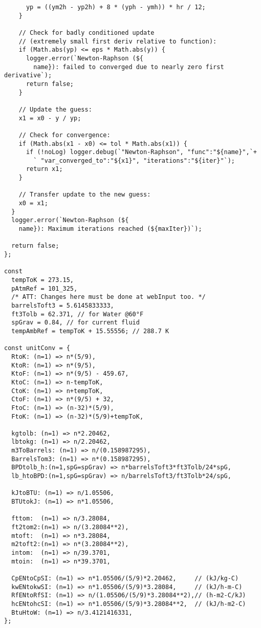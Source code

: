 \begin{verbatim}
      yp = ((ym2h - yp2h) + 8 * (yph - ymh)) * hr / 12;
    }

    // Check for badly conditioned update 
    // (extremely small first deriv relative to function):
    if (Math.abs(yp) <= eps * Math.abs(y)) {
      logger.error(`Newton-Raphson (${
        name}): failed to converged due to nearly zero first derivative`);
      return false;
    }

    // Update the guess:
    x1 = x0 - y / yp;

    // Check for convergence:
    if (Math.abs(x1 - x0) <= tol * Math.abs(x1)) {
      if (!noLog) logger.debug(`"Newton-Raphson", "func":"${name}",`+
        ` "var_converged_to":"${x1}", "iterations":"${iter}"`);
      return x1;
    }

    // Transfer update to the new guess:
    x0 = x1;
  }
  logger.error(`Newton-Raphson (${
    name}): Maximum iterations reached (${maxIter})`);

  return false;
};

const 
  tempToK = 273.15,
  pAtmRef = 101_325,
  /* ATT: Changes here must be done at webInput too. */
  barrelsToft3 = 5.6145833333,
  ft3Tolb = 62.371, // for Water @60°F
  spGrav = 0.84, // for current fluid
  tempAmbRef = tempToK + 15.55556; // 288.7 K

const unitConv = {
  RtoK: (n=1) => n*(5/9),
  KtoR: (n=1) => n*(9/5),
  KtoF: (n=1) => n*(9/5) - 459.67,
  KtoC: (n=1) => n-tempToK,
  CtoK: (n=1) => n+tempToK,
  CtoF: (n=1) => n*(9/5) + 32,
  FtoC: (n=1) => (n-32)*(5/9),
  FtoK: (n=1) => (n-32)*(5/9)+tempToK,

  kgtolb: (n=1) => n*2.20462,
  lbtokg: (n=1) => n/2.20462,
  m3ToBarrels: (n=1) => n/(0.158987295),
  BarrelsTom3: (n=1) => n*(0.158987295),
  BPDtolb_h:(n=1,spG=spGrav) => n*barrelsToft3*ft3Tolb/24*spG,
  lb_htoBPD:(n=1,spG=spGrav) => n/barrelsToft3/ft3Tolb*24/spG,

  kJtoBTU: (n=1) => n/1.05506,
  BTUtokJ: (n=1) => n*1.05506,

  fttom:  (n=1) => n/3.28084,
  ft2tom2:(n=1) => n/(3.28084**2),
  mtoft:  (n=1) => n*3.28084,
  m2toft2:(n=1) => n*(3.28084**2),
  intom:  (n=1) => n/39.3701,
  mtoin:  (n=1) => n*39.3701,

  CpENtoCpSI: (n=1) => n*1.05506/(5/9)*2.20462,     // (kJ/kg-C)
  kwENtokwSI: (n=1) => n*1.05506/(5/9)*3.28084,     // (kJ/h-m-C)
  RfENtoRfSI: (n=1) => n/(1.05506/(5/9)*3.28084**2),// (h-m2-C/kJ)
  hcENtohcSI: (n=1) => n*1.05506/(5/9)*3.28084**2,  // (kJ/h-m2-C)
  BtuHtoW: (n=1) => n/3.4121416331,
};


\end{verbatim}
